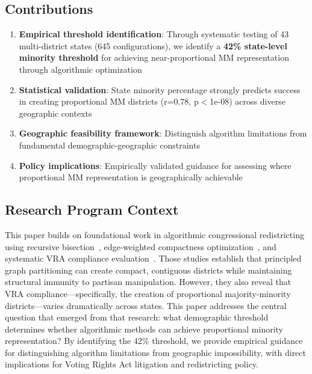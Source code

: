 \subsection{Contributions}

\begin{enumerate}
    \item \textbf{Empirical threshold identification}: Through systematic testing of 43 multi-district states (645 configurations), we identify a \textbf{42\% state-level minority threshold} for achieving near-proportional MM representation through algorithmic optimization
    \item \textbf{Statistical validation}: State minority percentage strongly predicts success in creating proportional MM districts (r=0.78, p$<$1e-08) across diverse geographic contexts
    \item \textbf{Geographic feasibility framework}: Distinguish algorithm limitations from fundamental demographic-geographic constraints
    \item \textbf{Policy implications}: Empirically validated guidance for assessing where proportional MM representation is geographically achievable
\end{enumerate}

\subsection{Research Program Context}

This paper builds on foundational work in algorithmic congressional redistricting using recursive bisection~\cite{della-libera-recursive-bisection}, edge-weighted compactness optimization~\cite{della-libera-edge-weighted}, and systematic VRA compliance evaluation~\cite{della-libera-vra-compliance}. Those studies establish that principled graph partitioning can create compact, contiguous districts while maintaining structural immunity to partisan manipulation. However, they also reveal that VRA compliance—specifically, the creation of proportional majority-minority districts—varies dramatically across states. This paper addresses the central question that emerged from that research: what demographic threshold determines whether algorithmic methods can achieve proportional minority representation? By identifying the 42\% threshold, we provide empirical guidance for distinguishing algorithm limitations from geographic impossibility, with direct implications for Voting Rights Act litigation and redistricting policy.

